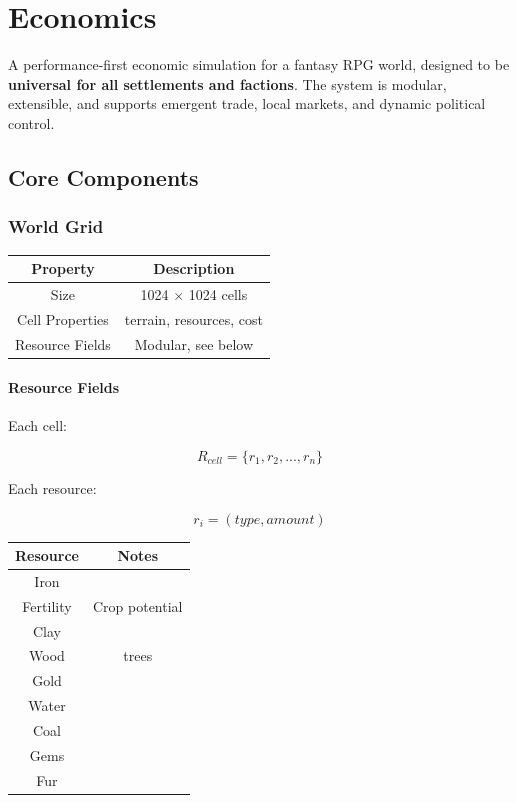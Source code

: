\section{Economics}
\label{sec:economics}

A performance-first economic simulation for a fantasy RPG world, designed to be \textbf{universal for all settlements and factions}. The system is modular, extensible, and supports emergent trade, local markets, and dynamic political control.



\subsection{Core Components}

\subsubsection{World Grid}

\begin{table}[H]
\centering
\begin{tabular}{|c|c|}
\hline
Property & Description \\
\hline
Size & 1024 $\times$ 1024 cells \\
Cell Properties & terrain, resources, cost \\
Resource Fields & Modular, see below \\
\hline
\end{tabular}
\end{table}



\paragraph{Resource Fields}

Each cell:

\begin{equation}
R_{cell} = \{ r_1, r_2, ..., r_n \}
\end{equation}

Each resource:

\begin{equation}
r_i = (type, amount)
\end{equation}

\begin{table}[H]
\centering
\begin{tabular}{|c|c|}
\hline
Resource & Notes \\
\hline
Iron &  \\
Fertility & Crop potential \\
Clay &  \\
Wood & trees \\
Gold &  \\
Water &  \\
Coal &  \\
Gems &  \\
Fur &  \\
\hline
\end{tabular}
\end{table}



